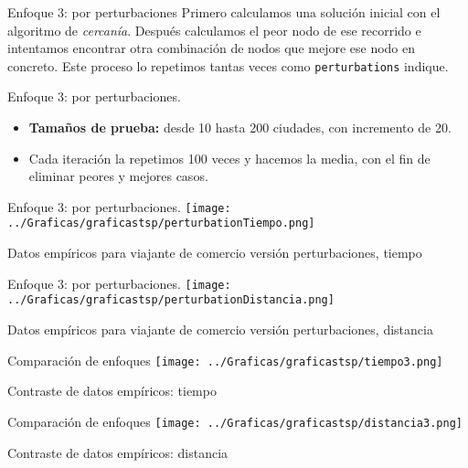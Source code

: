 \documentclass[10pt, xcolor=table]{beamer}
\begin{document}
\begin{frame}{Enfoque 3: por perturbaciones}
Primero calculamos una solución inicial con el algoritmo de \emph{cercanía}. Después calculamos el peor nodo de ese recorrido e intentamos encontrar otra combinación de nodos que mejore ese nodo en concreto. Este proceso lo repetimos tantas veces como \texttt{perturbations} indique. 
\end{frame}

\begin{frame}{Enfoque 3: por perturbaciones. }
\begin{itemize}
	\item \textbf{Tamaños de prueba:} desde 10 hasta 200 ciudades, con incremento de 20.
	\item Cada iteración la repetimos 100 veces y hacemos la media, con el fin de eliminar peores y mejores casos.
\end{itemize}
\end{frame}

\begin{frame}[fragile]{Enfoque 3: por perturbaciones. }
\texttt{[image: ../Graficas/graficastsp/perturbationTiempo.png]}
\begin{center}
	\footnotesize{Datos empíricos para viajante de comercio versión perturbaciones, tiempo}
\end{center}
\end{frame}

\begin{frame}[fragile]{Enfoque 3: por perturbaciones. }
\texttt{[image: ../Graficas/graficastsp/perturbationDistancia.png]}
\begin{center}
	\footnotesize{Datos empíricos para viajante de comercio versión perturbaciones, distancia}
\end{center}
\end{frame}

\begin{frame}[fragile]{Comparación de enfoques}
\texttt{[image: ../Graficas/graficastsp/tiempo3.png]}
\begin{center}
	\footnotesize{Contraste de datos empíricos: tiempo}
\end{center}
\end{frame}

\begin{frame}[fragile]{Comparación de enfoques}
\texttt{[image: ../Graficas/graficastsp/distancia3.png]}
\begin{center}
	\footnotesize{Contraste de datos empíricos: distancia}
\end{center}
\end{frame}
\end{document}

